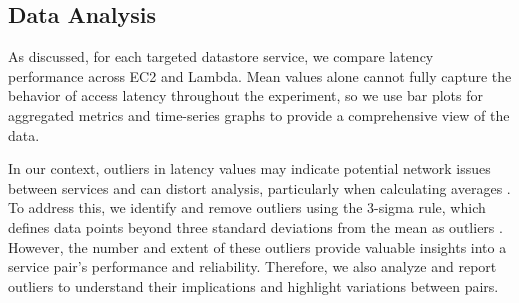 \subsection{Data Analysis}
\label{sec:analysis}

As discussed, for each targeted datastore service, we compare latency performance across EC2 and Lambda. Mean values alone cannot fully capture the behavior of access latency throughout the experiment, so we use bar plots for aggregated metrics and time-series graphs to provide a comprehensive view of the data.

In our context, outliers in latency values may indicate potential network issues between services and can distort analysis, particularly when calculating averages \cite{book_bermbach_cloud_service_benchmarking}. To address this, we identify and remove outliers using the 3-sigma rule, which defines data points beyond three standard deviations from the mean as outliers \cite{book_han_data_mining}. However, the number and extent of these outliers provide valuable insights into a service pair's performance and reliability. Therefore, we also analyze and report outliers to understand their implications and highlight variations between pairs.





